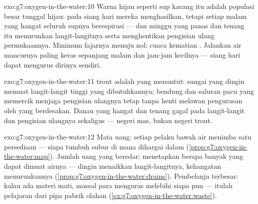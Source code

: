 \begin{solution}{exo:g7:oxygen-in-the-water:10}
Warna hijau seperti sup kacang itu adalah populasi besar  tunggal
hijau: pada siang hari mereka menghasilkan, tetapi setiap malam yang
hangat seluruh supnya berespirasi --- dan minggu yang panas dan tenang
itu menurunkan langit-langitnya serta menghentikan pengisian ulang
permukaannya. Minimum fajarnya menuju nol: cuaca kematian .
Jalankan air mancurnya paling keras sepanjang malam dan jam-jam
kecilnya --- siang hari dapat mengurus dirinya sendiri.
\end{solution}

\begin{solution}{exo:g7:oxygen-in-the-water:11}
 trout adalah  yang menuntut: sungai yang dingin memuat
langit-langit tinggi yang dibutuhkannya; bendung dan saluran pacu yang
memercik menjaga pengisian ulangnya tetap tanpa henti melawan
pengurasan oleh  yang berdesakan. Danau yang hangat dan tenang
gagal pada langit-langit dan pengisian ulangnya sekaligus --- negeri
 mas, bukan negeri  trout.
\end{solution}

\begin{solution}{exo:g7:oxygen-in-the-water:12}
Mata uang: setiap pelaku  bawah air menimba satu persediaan
 --- siapa tumbuh subur di mana dihargai dalam 
(\cref{prop:g7:oxygen-in-the-water:map}). Jumlah uang yang beredar:
 menetapkan berapa banyak yang dapat dimuat airnya --- dingin
menaikkan langit-langitnya, kehangatan menurunkannya
(\cref{prop:g7:oxygen-in-the-water:drains}). Pembelanja terbesar:
kalau ada materi mati,  massal para  menguras
melebihi siapa pun --- itulah pelajaran dari pipa pabrik olahan
 (\cref{ex:g7:oxygen-in-the-water:waste}).
\end{solution}


